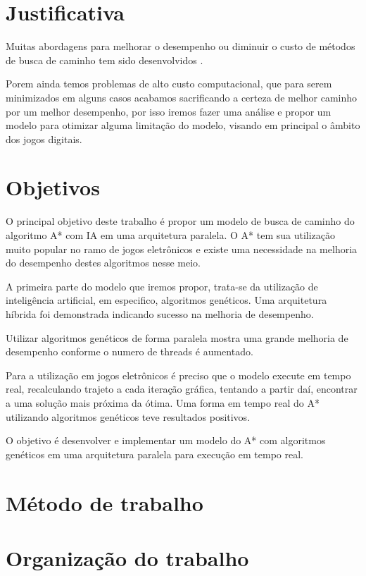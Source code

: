 \section{Justificativa}

Muitas abordagens para melhorar o desempenho ou diminuir o custo de métodos de busca de caminho tem sido desenvolvidos \cite{Ulysses}  \cite{Pollack} \cite{Pollack} \cite{Timothy} \cite{WilliamMiller}. 

Porem ainda temos problemas de alto custo computacional, que para serem minimizados em alguns casos acabamos sacrificando a certeza de melhor caminho \cite{Botea} por um melhor desempenho, por isso iremos fazer uma análise e propor um modelo para otimizar alguma limitação do modelo, visando em principal o âmbito dos jogos digitais.

\section{Objetivos}

O principal objetivo deste trabalho é propor um modelo de busca de caminho do algoritmo A* com IA em uma arquitetura paralela. O A* tem sua utilização muito popular no ramo de jogos eletrônicos e existe uma necessidade na melhoria do desempenho destes algoritmos nesse meio. \cite{Ross_Graham}

A primeira parte do modelo que iremos propor, trata-se da utilização de inteligência artificial, em especifico, algoritmos genéticos. Uma arquitetura híbrida foi demonstrada indicando sucesso na melhoria de desempenho. \cite{Ryan}

Utilizar algoritmos genéticos de forma paralela mostra uma grande melhoria de desempenho conforme o numero de threads é aumentado. \cite{Reza}

Para a utilização em jogos eletrônicos é preciso que o modelo execute em tempo real, recalculando trajeto a cada iteração gráfica, tentando a partir daí, encontrar a uma solução mais próxima da ótima. Uma forma em tempo real do A* utilizando algoritmos genéticos teve resultados positivos. \cite{Ulysses2}

O objetivo é desenvolver e implementar um modelo do A* com algoritmos genéticos em uma arquitetura paralela para execução em tempo real. 

\section{Método de trabalho}


\section{Organização do trabalho}


